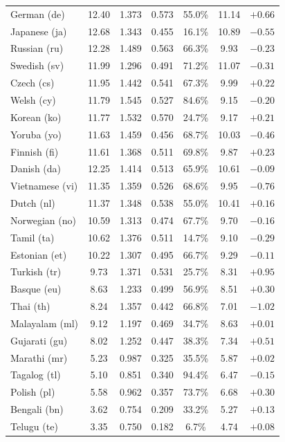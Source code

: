 \documentclass[11pt,a4paper]{article}
\begin{document}
\begin{table}[H]
\begin{tabular}{@{}lcccccc@{}}
German (de)     & 12.40 & 1.373 & 0.573 & 55.0\% & 11.14 & $+0.66$ \\
Japanese (ja)   & 12.68 & 1.343 & 0.455 & 16.1\% & 10.89 & $-0.55$ \\
Russian (ru)    & 12.28 & 1.489 & 0.563 & 66.3\% &  9.93 & $-0.23$ \\
Swedish (sv)    & 11.99 & 1.296 & 0.491 & 71.2\% & 11.07 & $-0.31$ \\
Czech (cs)      & 11.95 & 1.442 & 0.541 & 67.3\% &  9.99 & $+0.22$ \\
Welsh (cy)      & 11.79 & 1.545 & 0.527 & 84.6\% &  9.15 & $-0.20$ \\
Korean (ko)     & 11.77 & 1.532 & 0.570 & 24.7\% &  9.17 & $+0.21$ \\
Yoruba (yo)     & 11.63 & 1.459 & 0.456 & 68.7\% & 10.03 & $-0.46$ \\
Finnish (fi)    & 11.61 & 1.368 & 0.511 & 69.8\% &  9.87 & $+0.23$ \\
Danish (da)     & 12.25 & 1.414 & 0.513 & 65.9\% & 10.61 & $-0.09$ \\
Vietnamese (vi) & 11.35 & 1.359 & 0.526 & 68.6\% &  9.95 & $-0.76$ \\
Dutch (nl)      & 11.37 & 1.348 & 0.538 & 55.0\% & 10.41 & $+0.16$ \\
Norwegian (no)  & 10.59 & 1.313 & 0.474 & 67.7\% &  9.70 & $-0.16$ \\
Tamil (ta)      & 10.62 & 1.376 & 0.511 & 14.7\% &  9.10 & $-0.29$ \\
Estonian (et)   & 10.22 & 1.307 & 0.495 & 66.7\% &  9.29 & $-0.11$ \\
Turkish (tr)    &  9.73 & 1.371 & 0.531 & 25.7\% &  8.31 & $+0.95$ \\
Basque (eu)     &  8.63 & 1.233 & 0.499 & 56.9\% &  8.51 & $+0.30$ \\
Thai (th)       &  8.24 & 1.357 & 0.442 & 66.8\% &  7.01 & $-1.02$ \\
Malayalam (ml)  &  9.12 & 1.197 & 0.469 & 34.7\% &  8.63 & $+0.01$ \\
Gujarati (gu)   &  8.02 & 1.252 & 0.447 & 38.3\% &  7.34 & $+0.51$ \\
Marathi (mr)    &  5.23 & 0.987 & 0.325 & 35.5\% &  5.87 & $+0.02$ \\
Tagalog (tl)    &  5.10 & 0.851 & 0.340 & 94.4\% &  6.47 & $-0.15$ \\
Polish (pl)     &  5.58 & 0.962 & 0.357 & 73.7\% &  6.68 & $+0.30$ \\
Bengali (bn)    &  3.62 & 0.754 & 0.209 & 33.2\% &  5.27 & $+0.13$ \\
Telugu (te)     &  3.35 & 0.750 & 0.182 &  6.7\% &  4.74 & $+0.08$ \\
\bottomrule
\end{tabular}
\end{table}
\end{document}
